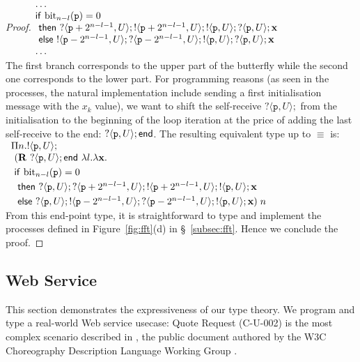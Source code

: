 \documentclass{LMCS}
\newcommand{\ptilde}[1]{{\ensuremath{#1}}}
\newcommand{\kf}[1]{\textup{\textsf{#1}}\xspace}
\newcommand{\pp}{\ensuremath{\at{\p}}}
\newcommand{\participant}[1]{\ensuremath{\mathtt{#1}}}
\newcommand{\p}{\ensuremath{\participant{p}}}
\newcommand{\Pifthenelse}[3]{\ensuremath{\kf{if}\ #1\ \kf{then}\ #2\ \kf{else}\ #3}}
\newcommand{\at}[1]{\ensuremath{\ptilde{#1}}}
\newcommand{\RECSEQP}[4]{\ensuremath{\mathbf{R} \ #1\ \lambda #2.\lambda #3.#4}}
\newcommand{\U}{\ensuremath{U}}
\newcommand{\End}{\kf{end}}
\newcommand{\Lout}[3]{\ensuremath{!\langle #1,#2\rangle;#3}}
\newcommand{\Lin}[3]{\ensuremath{?\langle #1,#2\rangle;#3}}
\newcommand{\LR}[4]{\RECSEQP{#1}{#2}{#3}{#4}}
\newcommand{\APP}{\;}
\newcommand{\xx}{\ensuremath{\mathbf{x}}}
\newcommand{\bit}[1]{\ensuremath{\text{bit}_{#1}}}
\begin{document}
\begin{proof}
{$\begin{array}{@{}l@{}l}
& \ldots \\
&\Pifthenelse{\bit{n-l}(\pp)=0 \\
& }{\Lin{\pp+2^{n-l-1}}{\U}{\Lout{\pp+2^{n-l-1}}{\U}{\Lout{\pp}{\U}{\Lin{\pp}\U{\xx}}}}\\
& }{\Lout{\pp-2^{n-l-1}}{\U}{\Lin{\pp-2^{n-l-1}}{\U}{\Lout{\pp}{\U}{\Lin{\pp}\U{\xx}}}}}\\
& \ldots \\
\end{array}$} 
\\[1mm]
The first branch corresponds to the upper part of the butterfly while the second
one corresponds to the lower part.
For programming reasons (as seen in the processes, the natural implementation
include sending a first initialisation message with the $x_k$ value), we want to
shift the self-receive $\Lin{\pp}\U{}$ from the initialisation to the beginning
of the loop iteration at the price of adding the last self-receive to the end:
$\Lin{\pp}\U{\End}$. 
The resulting equivalent type up to $\equiv$ is: \\[2mm]
{\small
$
\begin{array}{ll}
\Pi n.\Lout{\pp}{\U}{} \\
 \ (\LR{\Lin{\pp}\U{\End}}{l}{\xx} {\\[1mm]
 \  \Pifthenelse{\bit{n-l}(\pp)=0\\[1mm]
    \ } {\Lin{\pp}\U{\Lin{\pp+2^{n-l-1}}{\U}{\Lout{\pp+2^{n-l-1}}{\U}{\Lout{\pp}{\U}{\xx}}}}\\[1mm]
    \ } {\Lin{\pp}\U{\Lout{\pp-2^{n-l-1}}{\U}{\Lin{\pp-2^{n-l-1}}{\U}{\Lout{\pp}{\U}{\xx}}}}}}) \APP n
\end{array}
$
}\\[1mm]
From this end-point type, it is straightforward to type 
and implement the processes defined in 
Figure~\ref{fig:fft}(d) in \S~\ref{subsec:fft}. 
Hence we conclude the proof. 
\end{proof}






\subsection{Web Service} \label{sec:applications}
\noindent 
This section demonstrates the expressiveness of our type theory. We program and type a real-world Web service usecase: Quote Request (C-U-002) is the most complex scenario 
described in \cite{CDLRequirements}, the
public document authored by the W3C Choreography Description Language Working
Group \cite{CDL}. 
\end{document}
